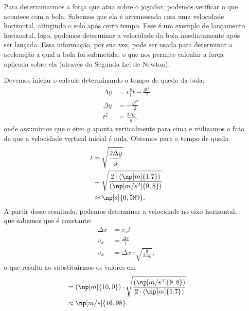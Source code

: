 Para determinarmos a força que atua sobre o jogador, podemos verificar o que acontece com a bola. Sabemos que ela é arremessada com uma velocidade horizontal, atingindo o solo após certo tempo. Esse é um exemplo de lançamento horizontal, logo, podemos determinar a velocidade da bola imediatamente após ser lançada. Essa informação, por sua vez, pode ser usada para determinar a aceleração a qual a bola foi submetida, o que nos permite calcular a força aplicada sobre ela (através da Segunda Lei de Newton).

Devemos iniciar o cálculo determinando o tempo de queda da bola:
\begin{align}
    \Delta y &= v_i^y t - \frac{gt^2}{2} \\
    \Delta y &= - \frac{gt^2}{2} \\
    t^2 &= \frac{2\Delta y}{g},
\end{align}
%
onde assumimos que o eixo $y$ aponta verticalmente para cima e utilizamos o fato de que a velocidade vertical inicial é nula. Obtemos para o tempo de queda
\begin{align}
    t &= \sqrt{\frac{2\Delta y}{g}} \\
    &= \sqrt{\frac{2\cdot(\np[m]{1.7})}{(\np[m/s^2]{9,8})}} \\
    &\approx \np[s]{0,589},
\end{align}
%
A partir desse resultado, podemos determinar a velocidade no eixo horizontal, que sabemos que é constante:
\begin{align}
    \Delta x &= v_x t \\
    v_x &= \frac{\Delta x}{t} \\
    v_x &= \Delta x \cdot \sqrt{\frac{g}{2\Delta y}},
\end{align}
%
o que resulta ao substituirmos os valores em
\begin{align}
    &= (\np[m]{10,0}) \cdot \sqrt{\frac{(\np[m/s^2]{9,8})}{2\cdot(\np[m]{1.7})}} \\
    &\approx \np[m/s]{16,98}.
\end{align}

